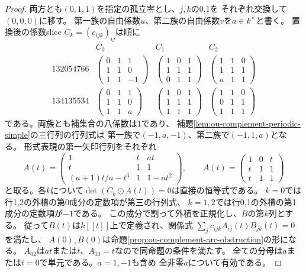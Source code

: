 \begin{proof}
両方とも$(0,1,1)$を指定の孤立零とし、$j,k$の0,1を
それぞれ交換して$(0,0,0)$に移す。
第一族の自由係数$u$、第二族の自由係数$v$を$a\in k^\times$と書く。
置換後の係数slice $C_k=(c_{ijk})_{ij}$は順に
\[
\begin{array}{c|ccc}
 &C_0&C_1&C_2\\ \hline
132054766&
\begin{pmatrix}0&1&1\\1&1&0\\1&1&-1\end{pmatrix}&
\begin{pmatrix}1&0&1\\1&1&1\\0&1&1\end{pmatrix}&
\begin{pmatrix}1&1&0\\1&1&1\\a&1&1\end{pmatrix}\\[3pt]
134135534&
\begin{pmatrix}0&1&1\\1&1&0\\1&1&a\end{pmatrix}&
\begin{pmatrix}1&0&1\\1&1&1\\1&1&1\end{pmatrix}&
\begin{pmatrix}1&1&0\\0&1&1\\1&1&1\end{pmatrix}
\end{array}
\]
である。両族とも補集合の八係数は1であり、
補題\ref{lem:ou-complement-periodic-simple}の三行列の行列式は
第一族で$(-1,a,-1)$、第二族で$(-1,1,a)$となる。
形式表現の第一矢印行列をそれぞれ
\[
 A(t)=
 \begin{pmatrix}
 1&t&at\\
 t&1&1\\
 (a+1)t/a-t^3&1&1-at^2
 \end{pmatrix},\qquad
 A(t)=
 \begin{pmatrix}
 1&0&t\\t&1&1\\t&1&1
 \end{pmatrix}
\]
と取る。各$k$について$\det(C_k\odot A(t))=0$は直接の恒等式である。
$k=0$では行1,2の外積の第0成分の定数項が第三の行列式、
$k=1,2$では行0,1の外積の第1成分の定数項が$-1$である。
この成分で割って外積を正規化し、$B$の第$k$列とする。
従って$B(t)$は$k[[t]]$上で定義され、関係式
$\sum_j c_{ijk}A_{ij}(t)B_{jk}(t)=0$を満たし、
$A(0),B(0)$は命題\ref{prop:ou-complement-arc-obstruction}の形になる。
$A_{02}$は$at$または$t$、$A_{10}=t$なので同命題の条件を満たす。
全ての分母は$a$または$t=0$で単元である。$a=1,-1$も含め
全非零$a$について有効である。


\end{proof}
